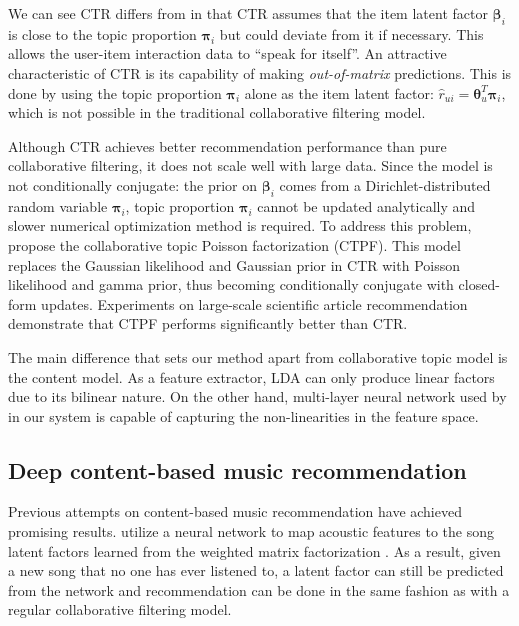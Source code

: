 We can see CTR differs from \cite{hu2008collaborative} in that CTR assumes that the item latent factor $\boldsymbol\beta_i$ is close to the topic proportion $\boldsymbol\pi_i$ but could deviate from it if necessary. This allows the user-item interaction data to ``speak for itself''. An attractive characteristic of CTR is its capability of making \emph{out-of-matrix} predictions.  This is done by using the topic proportion $\boldsymbol\pi_i$ alone as the item latent factor: $\hat{r}_{ui} = \boldsymbol\theta_u^T \boldsymbol\pi_i$, which is not possible in the traditional collaborative filtering model. 

Although CTR achieves better recommendation performance than pure collaborative filtering, it does not scale well with large data. Since the model is not conditionally conjugate: the prior on $\boldsymbol\beta_i$ comes from a Dirichlet-distributed random variable $\boldsymbol\pi_i$, topic proportion $\boldsymbol\pi_i$ cannot be updated analytically and slower numerical optimization method is required. 
To address this problem, \citet{gopalan2014content} propose the  collaborative topic Poisson factorization (CTPF). This model replaces the Gaussian likelihood and Gaussian prior in CTR with Poisson likelihood and gamma prior, thus becoming conditionally conjugate with closed-form updates. Experiments on large-scale scientific article recommendation demonstrate that CTPF performs significantly better than CTR.

The main difference that sets our method apart from collaborative topic model is the content model. As a feature extractor, LDA can only produce linear factors due to its bilinear nature. On the other hand, multi-layer neural network used by in our system is capable of capturing the non-linearities in the feature space. 

\subsection{Deep content-based music recommendation}\label{sec:sander}

Previous attempts on content-based music recommendation have achieved promising results. \citet{van2013deep} utilize a neural network to map acoustic features to the song latent factors learned from the weighted matrix factorization \cite{hu2008collaborative}. As a result, given a new song that no one has ever listened to, a latent factor can still be predicted from the network and recommendation can be done in the same fashion as with a regular collaborative filtering model. 

